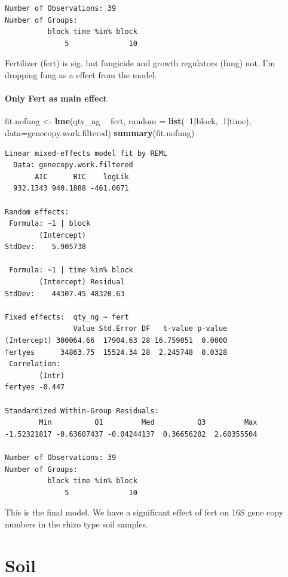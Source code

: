\documentclass[twoside,12pt,final]{ucthesis-CA2012}
\newenvironment{Shaded}{}{}
\newcommand{\KeywordTok}[1]{\textcolor[rgb]{0.00,0.44,0.13}{\textbf{{#1}}}}
\newcommand{\DataTypeTok}[1]{\textcolor[rgb]{0.56,0.13,0.00}{{#1}}}
\newcommand{\DecValTok}[1]{\textcolor[rgb]{0.25,0.63,0.44}{{#1}}}
\newcommand{\StringTok}[1]{\textcolor[rgb]{0.25,0.44,0.63}{{#1}}}
\newcommand{\NormalTok}[1]{{#1}}
\newcommand{\OperatorTok}[1]{\textcolor[rgb]{0.00,0.44,0.13}{\textbf{{#1}}}}
\begin{document}
\begin{ucmainmatter}
\begin{verbatim}
Number of Observations: 39
Number of Groups: 
          block time %in% block 
              5              10 
\end{verbatim}
Fertilizer (fert) is sig. but fungicide and growth regulators (fung) not. I'm dropping fung as a effect from the model.

\hypertarget{only-fert-as-main-effect}{%
\paragraph{Only Fert as main effect}\label{only-fert-as-main-effect}}
\begin{Shaded}
\begin{Highlighting}[]
\NormalTok{  fit.nofung <-}\StringTok{ }\KeywordTok{lme}\NormalTok{(qty_ng }\OperatorTok{~}\StringTok{ }\NormalTok{fert,}
                  \DataTypeTok{random =} \KeywordTok{list}\NormalTok{(}\OperatorTok{~}\DecValTok{1}\OperatorTok{|}\NormalTok{block,}\OperatorTok{~}\DecValTok{1}\OperatorTok{|}\NormalTok{time),}
                  \DataTypeTok{data=}\NormalTok{genecopy.work.filtered)}
  \KeywordTok{summary}\NormalTok{(fit.nofung)}
\end{Highlighting}
\end{Shaded}
\begin{verbatim}
Linear mixed-effects model fit by REML
  Data: genecopy.work.filtered 
       AIC      BIC    logLik
  932.1343 940.1888 -461.0671

Random effects:
 Formula: ~1 | block
        (Intercept)
StdDev:    5.905738

 Formula: ~1 | time %in% block
        (Intercept) Residual
StdDev:    44307.45 48320.63

Fixed effects:  qty_ng ~ fert 
                Value Std.Error DF   t-value p-value
(Intercept) 300064.66  17904.63 28 16.759051  0.0000
fertyes      34863.75  15524.34 28  2.245748  0.0328
 Correlation: 
        (Intr)
fertyes -0.447

Standardized Within-Group Residuals:
        Min          Q1         Med          Q3         Max 
-1.52321817 -0.63607437 -0.04244137  0.36656202  2.60355504 

Number of Observations: 39
Number of Groups: 
          block time %in% block 
              5              10 
\end{verbatim}
This is the final model. We have a significant effect of fert on 16S gene copy numbers in the rhizo type soil samples.

\hypertarget{soil}{%
\section{Soil}\label{soil}}


\end{ucmainmatter}
\end{document}

